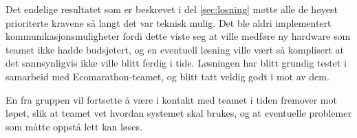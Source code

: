 Det endelige resultatet som er beskrevet i del \ref{sec:losning} møtte alle de høyest prioriterte kravene så langt det var teknisk mulig.
Det ble aldri implementert kommunikasjonsmuligheter fordi dette viste seg at ville medføre ny hardware som teamet ikke hadde budsjetert, og en eventuell løsning ville vært så komplisert at det sannsynligvis ikke ville blitt ferdig i tide.
Løsningen har blitt grundig testet i samarbeid med Ecomarathon-teamet, og blitt tatt veldig godt i mot av dem.

En fra gruppen vil fortsette å være i kontakt med teamet i tiden fremover mot løpet, slik at teamet vet hvordan systemet skal brukes, og at eventuelle problemer som måtte oppstå lett kan løses.
